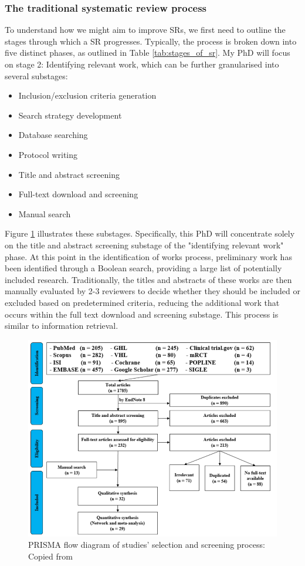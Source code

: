 \documentclass[10pt, english]{article}
\begin{document}
\subsubsection{The traditional systematic review process}

To understand how we might aim to improve SRs, we first need to outline the stages through which a SR progresses. Typically, the process is broken down into five distinct phases, as outlined in  Table \ref{tab:stages_of_sr}.
My PhD will focus on stage 2: Identifying relevant work, which can be further granularised into several substages:

\begin{itemize}
    \item Inclusion/exclusion criteria generation
    \item Search strategy development
    \item Database searching
    \item Protocol writing
    \item Title and abstract screening
    \item Full-text download and screening
    \item Manual search
\end{itemize}

Figure \ref{fig:selection_and_screening} illustrates these substages.
Specifically, this PhD will concentrate solely on the title and abstract screening substage of the "identifying relevant work" phase. At this point in the identification of works process, preliminary work has been identified through a Boolean search, providing a large list of potentially included research. Traditionally, the titles and abstracts of these works are then manually evaluated by 2-3 reviewers to decide whether they should be included or excluded based on predetermined criteria, reducing the additional work that occurs within the full text download and screening substage. This process is similar to information retrieval.

\begin{figure}
    \centering
    \includegraphics[width=0.8\linewidth]{images/reproduced_step_by_step_guide.png}
    \caption{PRISMA flow diagram of studies' selection and screening process: Copied from \cite{tawfik_step_2019}}
    \label{fig:selection_and_screening}
\end{figure}
\end{document}
